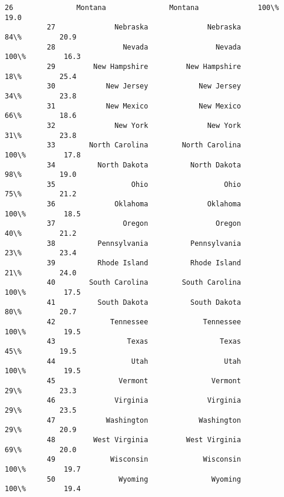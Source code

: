 \documentclass[11pt]{article}
\begin{document}
\begin{Verbatim}[commandchars=\\\{\}]
          26               Montana               Montana              100\%         19.0   
          27              Nebraska              Nebraska               84\%         20.9   
          28                Nevada                Nevada              100\%         16.3   
          29         New Hampshire         New Hampshire               18\%         25.4   
          30            New Jersey            New Jersey               34\%         23.8   
          31            New Mexico            New Mexico               66\%         18.6   
          32              New York              New York               31\%         23.8   
          33        North Carolina        North Carolina              100\%         17.8   
          34          North Dakota          North Dakota               98\%         19.0   
          35                  Ohio                  Ohio               75\%         21.2   
          36              Oklahoma              Oklahoma              100\%         18.5   
          37                Oregon                Oregon               40\%         21.2   
          38          Pennsylvania          Pennsylvania               23\%         23.4   
          39          Rhode Island          Rhode Island               21\%         24.0   
          40        South Carolina        South Carolina              100\%         17.5   
          41          South Dakota          South Dakota               80\%         20.7   
          42             Tennessee             Tennessee              100\%         19.5   
          43                 Texas                 Texas               45\%         19.5   
          44                  Utah                  Utah              100\%         19.5   
          45               Vermont               Vermont               29\%         23.3   
          46              Virginia              Virginia               29\%         23.5   
          47            Washington            Washington               29\%         20.9   
          48         West Virginia         West Virginia               69\%         20.0   
          49             Wisconsin             Wisconsin              100\%         19.7   
          50               Wyoming               Wyoming              100\%         19.4   
          

\end{Verbatim}
\end{document}
